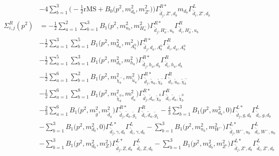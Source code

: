 \begin{itemize}
\begin{align}
 &-4 \sum_{b=1}^{3}\Big(-\frac{1}{2} \text{rMS}  + {B_0\Big(p^{2},m^2_{d_{{b}}},m^2_{{Z'}}\Big)}\Big){\Gamma^{R*}_{\check{\bar{d}}_{{j}},{Z'},d_{{b}}}} m_{d_{{b}}} {\Gamma^L_{\check{\bar{d}}_{{i}},{Z'},d_{{b}}}}  \\ 
\Sigma^R_{i,j}(p^2) &= -\frac{1}{2} \sum_{a=1}^{2}\sum_{b=1}^{3}{B_1\Big(p^{2},m^2_{u_{{b}}},m^2_{H^-_{{a}}}\Big)} {\Gamma^{R*}_{\check{\bar{d}}_{{j}},H^-_{{a}},u_{{b}}}} {\Gamma^R_{\check{\bar{d}}_{{i}},H^-_{{a}},u_{{b}}}}  \nonumber \\ 
 &-\frac{1}{2} \sum_{a=1}^{3}\sum_{b=1}^{5}{B_1\Big(p^{2},m^2_{d_{{a}}},m^2_{A^0_{{b}}}\Big)} {\Gamma^{R*}_{\check{\bar{d}}_{{j}},d_{{a}},A^0_{{b}}}} {\Gamma^R_{\check{\bar{d}}_{{i}},d_{{a}},A^0_{{b}}}}  \nonumber \\ 
 &-\frac{1}{2} \sum_{a=1}^{5}\sum_{b=1}^{3}{B_1\Big(p^{2},m^2_{d_{{b}}},m^2_{h_{{a}}}\Big)} {\Gamma^{R*}_{\check{\bar{d}}_{{j}},h_{{a}},d_{{b}}}} {\Gamma^R_{\check{\bar{d}}_{{i}},h_{{a}},d_{{b}}}}  \nonumber \\ 
 &-\frac{1}{2} \sum_{a=1}^{6}\sum_{b=1}^{2}{B_1\Big(p^{2},m^2_{\tilde{\chi}^-_{{b}}},m^2_{\tilde{u}_{{a}}}\Big)} {\Gamma^{R*}_{\check{\bar{d}}_{{j}},\tilde{u}_{{a}},\tilde{\chi}^-_{{b}}}} {\Gamma^R_{\check{\bar{d}}_{{i}},\tilde{u}_{{a}},\tilde{\chi}^-_{{b}}}}  \nonumber \\ 
 &-\frac{1}{2} \sum_{a=1}^{6}\sum_{b=1}^{8}{B_1\Big(p^{2},m^2_{\tilde{\chi}^0_{{b}}},m^2_{\tilde{d}_{{a}}}\Big)} {\Gamma^{R*}_{\check{\bar{d}}_{{j}},\tilde{d}_{{a}},\tilde{\chi}^0_{{b}}}} {\Gamma^R_{\check{\bar{d}}_{{i}},\tilde{d}_{{a}},\tilde{\chi}^0_{{b}}}}  \nonumber \\ 
 &-\frac{2}{3} \sum_{a=1}^{6}{B_1\Big(p^{2},m^2_{\tilde{g}},m^2_{\tilde{d}_{{a}}}\Big)} {\Gamma^{R*}_{\check{\bar{d}}_{{j}},\tilde{d}_{{a}},\tilde{g}_{{1}}}} {\Gamma^R_{\check{\bar{d}}_{{i}},\tilde{d}_{{a}},\tilde{g}_{{1}}}}  -\frac{4}{3} \sum_{b=1}^{3}{B_1\Big(p^{2},m^2_{d_{{b}}},0\Big)} {\Gamma^{L*}_{\check{\bar{d}}_{{j}},g,d_{{b}}}} {\Gamma^L_{\check{\bar{d}}_{{i}},g,d_{{b}}}}  \nonumber \\ 
 &- \sum_{b=1}^{3}{B_1\Big(p^{2},m^2_{d_{{b}}},0\Big)} {\Gamma^{L*}_{\check{\bar{d}}_{{j}},\gamma,d_{{b}}}} {\Gamma^L_{\check{\bar{d}}_{{i}},\gamma,d_{{b}}}}  - \sum_{b=1}^{3}{B_1\Big(p^{2},m^2_{u_{{b}}},m^2_{W^-}\Big)} {\Gamma^{L*}_{\check{\bar{d}}_{{j}},W^-,u_{{b}}}} {\Gamma^L_{\check{\bar{d}}_{{i}},W^-,u_{{b}}}}  \nonumber \\ 
 &- \sum_{b=1}^{3}{B_1\Big(p^{2},m^2_{d_{{b}}},m^2_{Z}\Big)} {\Gamma^{L*}_{\check{\bar{d}}_{{j}},Z,d_{{b}}}} {\Gamma^L_{\check{\bar{d}}_{{i}},Z,d_{{b}}}}  - \sum_{b=1}^{3}{B_1\Big(p^{2},m^2_{d_{{b}}},m^2_{{Z'}}\Big)} {\Gamma^{L*}_{\check{\bar{d}}_{{j}},{Z'},d_{{b}}}} {\Gamma^L_{\check{\bar{d}}_{{i}},{Z'},d_{{b}}}}  \\ 

\end{align}
\end{itemize}

